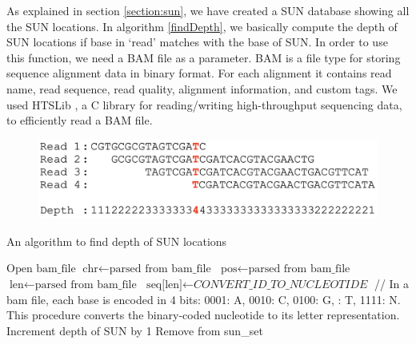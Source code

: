 As explained in section \ref{section:sun}, we have created a SUN database showing all the SUN locations. In algorithm \ref{findDepth}, we basically compute the depth of SUN locations if base in `read' matches with the base of SUN. In order to use this function, we need a BAM file as a parameter. BAM \cite{li2009sequence} is a file type for storing sequence alignment data in binary format. For each alignment it contains read name, read sequence, read quality, alignment information, and custom tags. We used HTSLib \cite{htslib}, a C library for reading/writing high-throughput sequencing data, to efficiently read a BAM file.
\begin{figure}[ht]
    \centering
    \includegraphics[scale=0.4]{images/depthofcoverage.png}
    \caption{}
    \label{depthOfCoverage}
\end{figure}
\begin{algorithm}
\caption{An algorithm to find depth of SUN locations}
\label{findDepth}
\begin{algorithmic}[1]
\State $\text{Open bam\_file}$
\State $\text{chr} \gets \text{parsed from bam\_file}$
\State $\text{pos} \gets \text{parsed from bam\_file}$
\State $\text{len} \gets \text{parsed from bam\_file}$
\State $\text{seq[len]} \gets \textit{CONVERT\_ID\_TO\_NUCLEOTIDE}$ // In a bam file, 
\State each base is encoded in 4 bits: 0001: A, 0010: C, 0100: G, 
: T, 1111: N. This procedure converts the binary-coded 
\State nucleotide to its letter representation.
\State Increment depth of SUN by 1
\Else
\State Remove from sun\_set
\EndIf
\EndFor
\EndFor
\EndIf
\EndProcedure
\end{algorithmic}
\end{algorithm}

